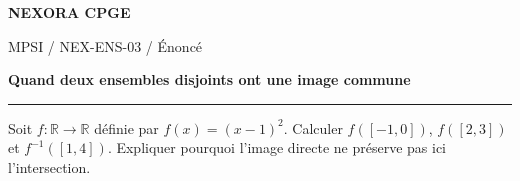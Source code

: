 \documentclass[11pt,a4paper]{article}
\begin{document}
{\small\bfseries\color{nexorablue} NEXORA CPGE}\par
{\small MPSI / NEX-ENS-03 / Énoncé}\par
{\LARGE\bfseries Quand deux ensembles disjoints ont une image commune}\par
\vspace{0.25em}\hrule\vspace{0.6em}

Soit $f:\mathbb R\to\mathbb R$ définie par $f(x)=(x-1)^2$. Calculer $f([-1,0])$, $f([2,3])$ et $f^{-1}([1,4])$. Expliquer pourquoi l’image directe ne préserve pas ici l’intersection.
\end{document}
